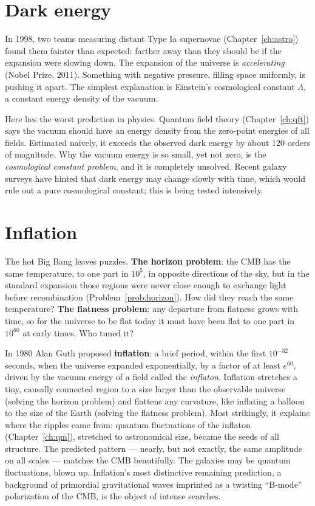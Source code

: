 \section{Dark energy}

In 1998, two teams measuring distant Type Ia supernovae (Chapter~\ref{ch:astro}) found them fainter than expected: farther away than they should be if the expansion were slowing down. The expansion of the universe is \emph{accelerating} (Nobel Prize, 2011). Something with negative pressure, filling space uniformly, is pushing it apart. The simplest explanation is Einstein's cosmological constant $\Lambda$, a constant energy density of the vacuum.

Here lies the worst prediction in physics. Quantum field theory (Chapter~\ref{ch:qft}) says the vacuum should have an energy density from the zero-point energies of all fields. Estimated naively, it exceeds the observed dark energy by about $120$ orders of magnitude. Why the vacuum energy is so small, yet not zero, is the \emph{cosmological constant problem}, and it is completely unsolved. Recent galaxy surveys have hinted that dark energy may change slowly with time, which would rule out a pure cosmological constant; this is being tested intensively.

\section{Inflation}

The hot Big Bang leaves puzzles. \textbf{The horizon problem}: the CMB has the same temperature, to one part in $10^5$, in opposite directions of the sky, but in the standard expansion those regions were never close enough to exchange light before recombination (Problem~\ref{prob:horizon}). How did they reach the same temperature? \textbf{The flatness problem}: any departure from flatness grows with time, so for the universe to be flat today it must have been flat to one part in $10^{60}$ at early times. Who tuned it?

In 1980 Alan Guth proposed \textbf{inflation}: a brief period, within the first $10^{-32}$ seconds, when the universe expanded exponentially, by a factor of at least $e^{60}$, driven by the vacuum energy of a field called the \emph{inflaton}. Inflation stretches a tiny, causally connected region to a size larger than the observable universe (solving the horizon problem) and flattens any curvature, like inflating a balloon to the size of the Earth (solving the flatness problem). Most strikingly, it explains where the ripples came from: quantum fluctuations of the inflaton (Chapter~\ref{ch:qm}), stretched to astronomical size, became the seeds of all structure. The predicted pattern --- nearly, but not exactly, the same amplitude on all scales --- matches the CMB beautifully. The galaxies may be quantum fluctuations, blown up. Inflation's most distinctive remaining prediction, a background of primordial gravitational waves imprinted as a twisting ``B-mode'' polarization of the CMB, is the object of intense searches.

